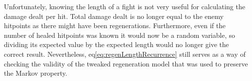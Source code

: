 Unfortunately, knowing the length of a fight is not very useful for calculating the damage dealt per hit. Total damage dealt is no longer equal to the enemy hitpoints as there might have been regenerations. Furthermore, even if the number of healed hitpoints was known it would now be a random variable, so dividing its expected value by the expected length would no longer give the correct result. Nevertheless, eq\ref{eq:regenLengthRecurrence} still serves as a way of checking the validity of the tweaked regeneration model that was used to preserve the Markov property.

